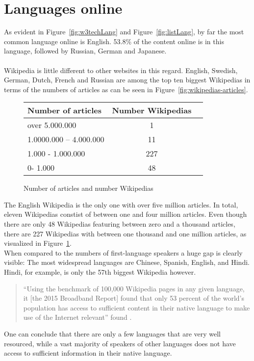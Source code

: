 \section{Languages online}

As evident in Figure~\ref{fig:w3techLang} and Figure~\ref{fig:listLang}, by far the most common language online is English. 53.8\% of the content online is in this language, followed by Russian, German and Japanese. \citep{w3techLang} \\
\\
Wikipedia is little different to other websites in this regard. English, Swedish, German, Dutch, French and Russian are among the top ten biggest Wikipedias in terms of the numbers of articles as can be seen in Figure~\ref{fig:wikipedias-articles}. \\
\begin{figure}[H]
\begin{center}
	\begin{tabular}{| l | c | r |}
		\hline			
		Number of articles & Number Wikipedias \\ \hline
		over 5.000.000 & 1 \\
		1.0000.000 -- 4.000.000 & 11 \\
		1.000 - 1.000.000 & 227 \\
		0- 1.000 & 48 \\
		\hline  
	\end{tabular}
	\end{center}
	\caption{Number of articles and number Wikipedias}
	\label{fig:tableNumWP}
\end{figure}

The English Wikipedia is the only one with over five million articles. In total, eleven Wikipedias constist of between one and four million articles. Even though there are only 48 Wikipedias featuring between zero and a thousand articles, there are 227 Wikipedias with between one thousand and one million articles, as visualized in Figure~\ref{fig:tableNumWP}. \citep{wiki:30} \\

When compared to the numbers of first-language speakers a huge gap is clearly visible: The most widespread languages are Chinese, Spanish, English, and Hindi. Hindi, for example, is only the 57th biggest Wikipedia however.
\begin{quote}
``Using the benchmark of 100,000 Wikipedia pages in any given language, it [the 2015 Broadband Report] found that only 53 percent of the world’s population has access to sufficient content in their native language to make use of the Internet relevant'' found \citet{atlanticLang}.
\end{quote} 
One can conclude that there are only a few languages that are very well resourced, while a vast majority of speakers of other languages does not have access to sufficient information in their native language. 